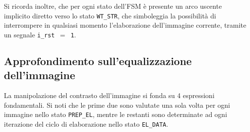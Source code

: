 \documentclass{article}
\begin{document}
\vspace{0,3cm}

Si ricorda inoltre, che per ogni stato dell'FSM è presente un arco uscente implicito diretto verso lo stato \texttt{WT\_STR}, 
che simboleggia la possibilità di interrompere in qualsiasi momento l'elaborazione dell'immagine corrente, tramite un segnale \texttt{i\_rst $=$ 1}.
\vspace{0,3cm}

\subsection{Approfondimento sull'equalizzazione dell'immagine} %
\label{sec:appr}
La manipolazione del contrasto dell’immagine si fonda su 4 espressioni fondamentali. Si noti che le prime due sono valutate una sola volta per ogni immagine nello stato \texttt{PREP\_EL}, mentre le restanti sono determinate ad ogni iterazione del ciclo di elaborazione nello stato \texttt{EL\_DATA}.
\end{document}
